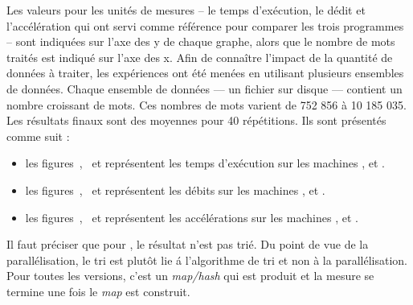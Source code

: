 Les valeurs pour les unit\'es de mesures -- le temps d'ex\'ecution, le d\'edit et l'acc\'el\'eration qui ont servi comme r\'ef\'erence pour comparer les trois programmes -- sont indiqu\'ees sur l'axe des y de chaque graphe, alors que le nombre de mots trait\'es est indiqu\'e sur l'axe des x. Afin de conna\^itre l'impact de la quantit\'e de donn\'ees \`a traiter, les exp\'eriences ont \'et\'e men\'ees en utilisant plusieurs ensembles de donn\'ees. Chaque ensemble de donn\'ees — un fichier sur disque — contient un nombre croissant de mots. Ces nombres de mots varient de 752 856 \`a 10 185 035. Les r\'esultats finaux sont des moyennes pour 40 r\'ep\'etitions. Ils sont pr\'esent\'es comme suit : 

\begin{itemize}

\item les figures~,~ et  repr\'esentent les temps d'ex\'ecution sur les machines ,  et .

\item les figures~,~ et  repr\'esentent les d\'ebits sur les machines ,  et .

\item les figures~,~ et  repr\'esentent les acc\'el\'erations sur les machines ,  et .

\end{itemize}


Il faut pr\'eciser que pour , le r\'esultat n'est pas tri\'e. Du point de vue de la parall\'elisation, le tri est plut\^ot lie \'a l'algorithme de tri et non \`a la parall\'elisation. Pour toutes les versions, c'est un \emph{map/hash} qui est produit et la mesure se termine une fois le \emph{map} est construit.

